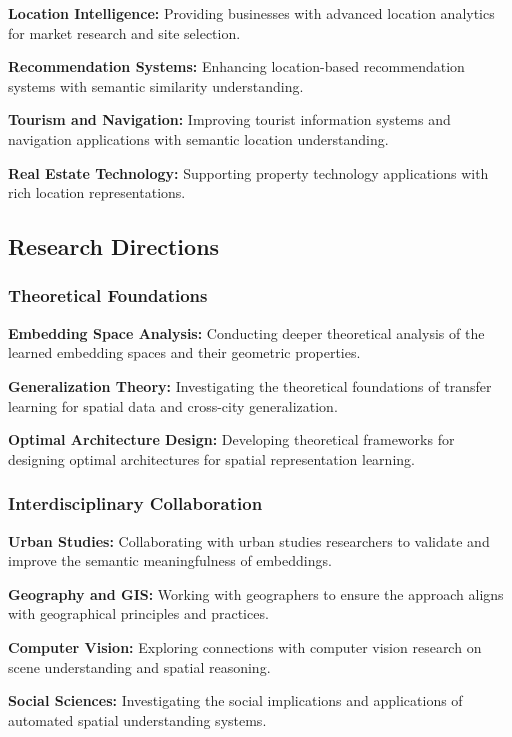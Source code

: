 \textbf{Location Intelligence:} Providing businesses with advanced location analytics for market research and site selection.

\textbf{Recommendation Systems:} Enhancing location-based recommendation systems with semantic similarity understanding.

\textbf{Tourism and Navigation:} Improving tourist information systems and navigation applications with semantic location understanding.

\textbf{Real Estate Technology:} Supporting property technology applications with rich location representations.

\subsection{Research Directions}

\subsubsection{Theoretical Foundations}

\textbf{Embedding Space Analysis:} Conducting deeper theoretical analysis of the learned embedding spaces and their geometric properties.

\textbf{Generalization Theory:} Investigating the theoretical foundations of transfer learning for spatial data and cross-city generalization.

\textbf{Optimal Architecture Design:} Developing theoretical frameworks for designing optimal architectures for spatial representation learning.

\subsubsection{Interdisciplinary Collaboration}

\textbf{Urban Studies:} Collaborating with urban studies researchers to validate and improve the semantic meaningfulness of embeddings.

\textbf{Geography and GIS:} Working with geographers to ensure the approach aligns with geographical principles and practices.

\textbf{Computer Vision:} Exploring connections with computer vision research on scene understanding and spatial reasoning.

\textbf{Social Sciences:} Investigating the social implications and applications of automated spatial understanding systems.

